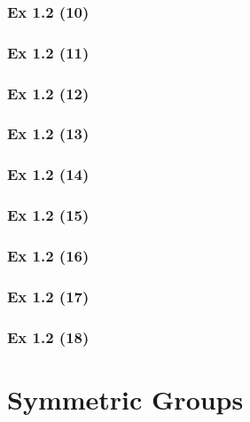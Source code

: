 \subsubsection{Ex 1.2 (10)}\label{sec:Ex_1.2.10}

\newpage		%

\subsubsection{Ex 1.2 (11)}\label{sec:Ex_1.2.11}

\subsubsection{Ex 1.2 (12)}\label{sec:Ex_1.2.12}

\subsubsection{Ex 1.2 (13)}\label{sec:Ex_1.2.13}

\subsubsection{Ex 1.2 (14)}\label{sec:Ex_1.2.14}

\subsubsection{Ex 1.2 (15)}\label{sec:Ex_1.2.15}

\subsubsection{Ex 1.2 (16)}\label{sec:Ex_1.2.16}

\subsubsection{Ex 1.2 (17)}\label{sec:Ex_1.2.17}

\subsubsection{Ex 1.2 (18)}\label{sec:Ex_1.2.18}

\newpage		%

\section{Symmetric Groups}\label{sec:1.3}
